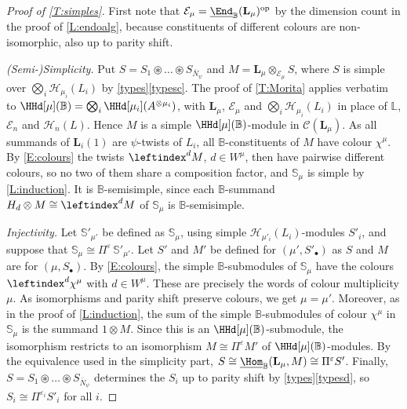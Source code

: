 \documentclass[a4paper,11pt]{amsart}
\newcommand{\uHom}{\underline{\Hom}}
\newcommand{\uEnd}{\underline{\End}}
\numberwithin{equation}{subsection}
\theoremstyle{definition}
\theoremstyle{theorem}
\theoremstyle{remark}
\newcommand\Sym{W}
\newcommand{\Bo}{\mathbb{B}}
\newcommand{\Lo}{\mathbb{L}}
\newcommand{\So}{\mathbb{S}}
\begin{document}
\begin{proof}[Proof of \autoref{T:simples}]
First note that $\mathcal E_\mu=\uEnd_{\Bo}(\mathbf L_\mu)^{\mathrm{op}}$ by the dimension count in the proof of \autoref{L:endoalg}, because constituents of different colours are non-isomorphic, also up to parity shift.

  \emph{(Semi-)Simplicity.} Put $S=S_1\circledast\dots\circledast S_{\bar N_\psi}$
  and $M=\mathbf L_\mu\otimes_{\mathcal E_\mu}S$, where $S$ is simple over
  $\bigotimes_i\mathcal H_{\mu_i}(L_i)$ by \autoref{types}\autoref{typesc}. The proof of \autoref{T:Morita} applies verbatim to $\HHd[\mu](\Bo)=\bigotimes_i\HHd[\mu_i](A^{\otimes\mu_i})$, with $\mathbf L_\mu$, $\mathcal E_\mu$ and $\bigotimes_i\mathcal H_{\mu_i}(L_i)$ in place of $\Lo$, $\mathcal E_n$ and $\mathcal H_n(L)$. Hence $M$ is a simple $\HHd[\mu](\Bo)$-module in $\mathcal C(\mathbf L_\mu)$. As all summands of $\mathbf L_i(1)$ are $\psi$-twists of $L_i$, all $\Bo$-constituents of $M$ have colour $\chi^\mu$. By \autoref{E:colours} the twists
  $\leftindex^{d}M$, $d\in\Sym^{\mu}$, then have pairwise different
  colours, so no two of them share a composition factor, and
  $\So_\mu$ is simple by \autoref{L:induction}. It is
  $\Bo$-semisimple, since each $\Bo$-summand $H_d\otimes M\cong\leftindex^{d}M$ of $\So_\mu$ is $\Bo$-semisimple.

  \emph{Injectivity.} Let $\So'_{\mu'}$ be defined as $\So_\mu$, using simple $\mathcal H_{\mu'_i}(L_i)$-modules $S'_i$, and suppose that $\So_\mu\cong\Pi^{\varepsilon}\,\So'_{\mu'}$. Let $S'$ and $M'$ be defined for $(\mu',S'_\bullet)$ as $S$ and $M$ are for $(\mu,S_\bullet)$. By \autoref{E:colours}, the simple $\Bo$-submodules of $\So_\mu$ have the colours $\leftindex^{d}\chi^\mu$ with $d\in\Sym^\mu$. These are precisely the words of colour multiplicity $\mu$. As isomorphisms and parity shift preserve colours, we get $\mu=\mu'$. Moreover, as in the proof of \autoref{L:induction}, the sum of the simple $\Bo$-submodules of colour $\chi^\mu$ in $\So_\mu$ is the summand $1\otimes M$. Since this is an $\HHd[\mu](\Bo)$-submodule, the isomorphism restricts to an isomorphism $M\cong\Pi^{\varepsilon}M'$ of $\HHd[\mu](\Bo)$-modules. By the equivalence used in the simplicity part, $S\cong\uHom_{\Bo}(\mathbf L_\mu,M)\cong\Pi^{\varepsilon}S'$. Finally, $S=S_1\circledast\dots\circledast S_{\bar N_\psi}$ determines the $S_i$ up to parity shift by \autoref{types}\autoref{typesd}, so $S_i\cong\Pi^{\varepsilon_i}S'_i$ for all $i$.


\end{proof}
\end{document}
